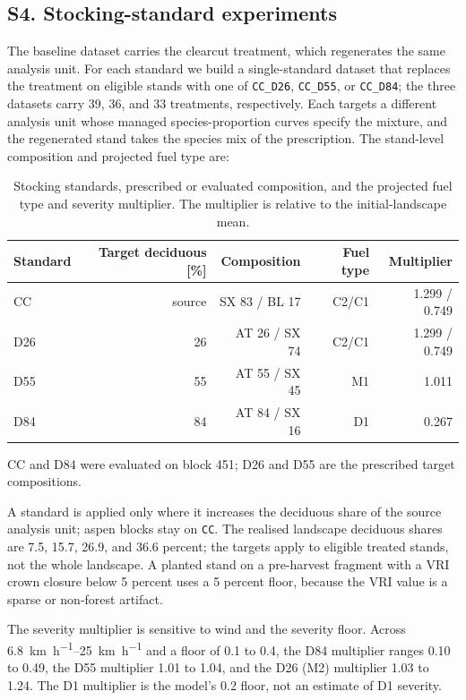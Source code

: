 \subsection*{S4. Stocking-standard experiments}

The baseline dataset carries the clearcut treatment, which regenerates the same analysis unit. For
each standard we build a single-standard dataset that replaces the treatment on eligible stands with
one of \texttt{CC\_D26}, \texttt{CC\_D55}, or \texttt{CC\_D84}; the three datasets carry 39, 36,
and 33 treatments, respectively. Each targets a different analysis unit whose managed species-proportion curves
specify the mixture, and the regenerated stand takes the species mix of the prescription. The
stand-level composition and projected fuel type are:

\begin{table}[h]
    \centering
    \small
    \caption{Stocking standards, prescribed or evaluated composition, and the projected fuel type
    and severity multiplier. The multiplier is relative to the initial-landscape mean.}
    \label{tab:supp_standards}
    \begin{tabular}{lrrrr}
        \toprule
        Standard & Target deciduous [\%] & Composition & Fuel type & Multiplier \\
        \midrule
        CC  & source & SX 83 / BL 17 & C2/C1 & 1.299 / 0.749 \\
        D26 & 26     & AT 26 / SX 74 & C2/C1 & 1.299 / 0.749 \\
        D55 & 55     & AT 55 / SX 45 & M1    & 1.011 \\
        D84 & 84     & AT 84 / SX 16 & D1    & 0.267 \\
        \bottomrule
    \end{tabular}
    \par\smallskip\footnotesize CC and D84 were evaluated on block 451; D26 and D55 are the prescribed
    target compositions.
\end{table}

A standard is applied only where it increases the deciduous share of the source analysis unit;
aspen blocks stay on \texttt{CC}. The realised landscape deciduous shares are 7.5, 15.7, 26.9, and
36.6 percent; the targets apply to eligible treated stands, not the whole landscape. A planted stand
on a pre-harvest fragment with a VRI crown closure below 5 percent uses a 5 percent floor, because
the VRI value is a sparse or non-forest artifact.

The severity multiplier is sensitive to wind and the severity floor. Across
\SIrange{6.8}{25}{\kilo\meter\per\hour} and a floor of 0.1 to 0.4, the D84 multiplier ranges
0.10 to 0.49, the D55 multiplier 1.01 to 1.04, and the D26 (M2) multiplier 1.03 to 1.24. The D1
multiplier is the model's 0.2 floor, not an estimate of D1 severity.

